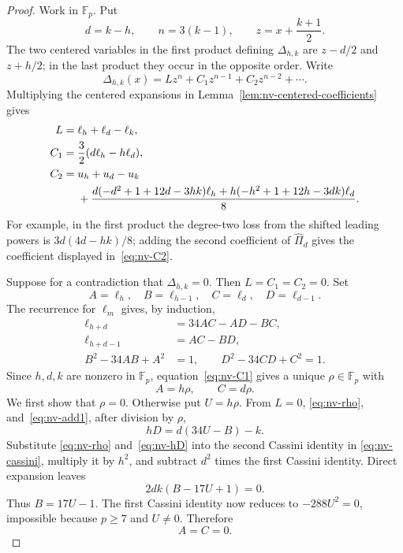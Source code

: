\begin{proof}
Work in $\mathbb F_p$.  Put
\[
 d=k-h,\qquad n=3(k-1),\qquad z=x+\frac{k+1}{2}.
\]
The two centered variables in the first product defining
$\Delta_{h,k}$ are $z-d/2$ and $z+h/2$; in the last product they occur
in the opposite order.  Write
\[
 \Delta_{h,k}(x)
 =Lz^n+C_1z^{n-1}+C_2z^{n-2}+\cdots.
\]
Multiplying the centered expansions in
Lemma~\ref{lem:nv-centered-coefficients} gives
\begin{align}
 L={}&\ell_h+\ell_d-\ell_k,                              \label{eq:nv-L}\\
 C_1={}&\frac32(d\ell_h-h\ell_d),                       \label{eq:nv-C1}\\
 C_2={}&u_h+u_d-u_k\notag\\
 &+\frac{d(-d^2+1+12d-3hk)\ell_h
          +h(-h^2+1+12h-3dk)\ell_d}{8}.                \label{eq:nv-C2}
\end{align}
For example, in the first product the degree-two loss from the shifted
leading powers is $3d(4d-hk)/8$; adding the second coefficient of
$\widehat\Pi_d$ gives the coefficient displayed in~\eqref{eq:nv-C2}.

Suppose for a contradiction that $\Delta_{h,k}=0$.  Then
$L=C_1=C_2=0$.  Set
\[
 A=\ell_h,\quad B=\ell_{h-1},\quad
 C=\ell_d,\quad D=\ell_{d-1}.
\]
The recurrence for $\ell_m$ gives, by induction,
\begin{align}
 \ell_{h+d}&=34AC-AD-BC,                                \label{eq:nv-add1}\\
 \ell_{h+d-1}&=AC-BD,                                  \label{eq:nv-add2}\\
 B^2-34AB+A^2&=1,\qquad
 D^2-34CD+C^2=1.                                       \label{eq:nv-cassini}
\end{align}
Since $h,d,k$ are nonzero in $\mathbb F_p$,
equation~\eqref{eq:nv-C1} gives a unique $\rho\in\mathbb F_p$ with
\begin{equation}
 A=h\rho,\qquad C=d\rho.
                                                        \label{eq:nv-rho}
\end{equation}
We first show that $\rho=0$.  Otherwise put $U=h\rho$.  From
$L=0$, \eqref{eq:nv-rho}, and~\eqref{eq:nv-add1}, after division by $\rho$,
\begin{equation}
 hD=d(34U-B)-k.
                                                        \label{eq:nv-hD}
\end{equation}
Substitute \eqref{eq:nv-rho} and~\eqref{eq:nv-hD} into the second Cassini identity in
\eqref{eq:nv-cassini}, multiply it by $h^2$, and subtract $d^2$
times the first Cassini identity.  Direct expansion leaves
\[
 2dk(B-17U+1)=0.
\]
Thus $B=17U-1$.  The first Cassini identity now reduces to
$-288U^2=0$, impossible because $p\geq7$ and $U\ne0$.
Therefore
\begin{equation}
 A=C=0.
                                                        \label{eq:nv-ACzero}
\end{equation}


\end{proof}
